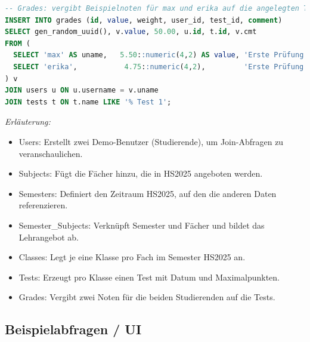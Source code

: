 \documentclass[12pt,a4paper]{article}
\begin{document}
\begin{lstlisting}[language=SQL]
-- Grades: vergibt Beispielnoten für max und erika auf die angelegten Tests
INSERT INTO grades (id, value, weight, user_id, test_id, comment)
SELECT gen_random_uuid(), v.value, 50.00, u.id, t.id, v.cmt
FROM (
  SELECT 'max' AS uname,   5.50::numeric(4,2) AS value, 'Erste Prüfung'::varchar(255) AS cmt UNION ALL
  SELECT 'erika',           4.75::numeric(4,2),         'Erste Prüfung'
) v
JOIN users u ON u.username = v.uname
JOIN tests t ON t.name LIKE '% Test 1';
    \end{lstlisting}

    \textit{Erläuterung:}
    \begin{itemize}
        \item Users: Erstellt zwei Demo-Benutzer (Studierende), um Join-Abfragen zu veranschaulichen.
        \item Subjects: Fügt die Fächer hinzu, die in HS2025 angeboten werden.
        \item Semesters: Definiert den Zeitraum HS2025, auf den die anderen Daten referenzieren.
        \item Semester\_Subjects: Verknüpft Semester und Fächer und bildet das Lehrangebot ab.
        \item Classes: Legt je eine Klasse pro Fach im Semester HS2025 an.
        \item Tests: Erzeugt pro Klasse einen Test mit Datum und Maximalpunkten.
        \item Grades: Vergibt zwei Noten für die beiden Studierenden auf die Tests.
    \end{itemize}


    \subsection{Beispielabfragen / UI}
\end{document}

